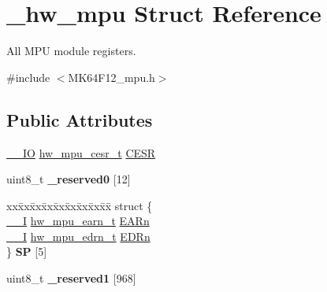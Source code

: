 \hypertarget{struct__hw__mpu}{}\section{\+\_\+hw\+\_\+mpu Struct Reference}
\label{struct__hw__mpu}


All M\+PU module registers.  




{\ttfamily \#include $<$M\+K64\+F12\+\_\+mpu.\+h$>$}

\subsection*{Public Attributes}
\begin{DoxyCompactItemize}
\item 
\hyperlink{core__sc300_8h_aec43007d9998a0a0e01faede4133d6be}{\+\_\+\+\_\+\+IO} \hyperlink{union__hw__mpu__cesr}{hw\+\_\+mpu\+\_\+cesr\+\_\+t} \hyperlink{struct__hw__mpu_a83c6bacc5ab8f9f538ece7a9c91e53a2}{C\+E\+SR}
\item 
uint8\+\_\+t {\bfseries \+\_\+reserved0} \mbox{[}12\mbox{]}\hypertarget{struct__hw__mpu_a043fd3c77101ad7b6f88355e964edb34}{}\label{struct__hw__mpu_a043fd3c77101ad7b6f88355e964edb34}

\item 
\begin{tabbing}
xx\=xx\=xx\=xx\=xx\=xx\=xx\=xx\=xx\=\kill
struct \{\\
\>\hyperlink{core__sc300_8h_af63697ed9952cc71e1225efe205f6cd3}{\_\_I} \hyperlink{union__hw__mpu__earn}{hw\_mpu\_earn\_t} \hyperlink{struct__hw__mpu_a6b4b39a1b2df6b57373e48d48da53568}{EARn}\\
\>\hyperlink{core__sc300_8h_af63697ed9952cc71e1225efe205f6cd3}{\_\_I} \hyperlink{union__hw__mpu__edrn}{hw\_mpu\_edrn\_t} \hyperlink{struct__hw__mpu_a31c5e39c6a3c3dad8878f46826be4781}{EDRn}\\
\} {\bfseries SP} \mbox{[}5\mbox{]}\hypertarget{struct__hw__mpu_af3e9a70ab820e4cd449e5b46381f72e3}{}\label{struct__hw__mpu_af3e9a70ab820e4cd449e5b46381f72e3}
\\

\end{tabbing}\item 
uint8\+\_\+t {\bfseries \+\_\+reserved1} \mbox{[}968\mbox{]}\hypertarget{struct__hw__mpu_aae83c1283398fb82a73ceb9cd86a9c83}{}\label{struct__hw__mpu_aae83c1283398fb82a73ceb9cd86a9c83}


\end{DoxyCompactItemize}
